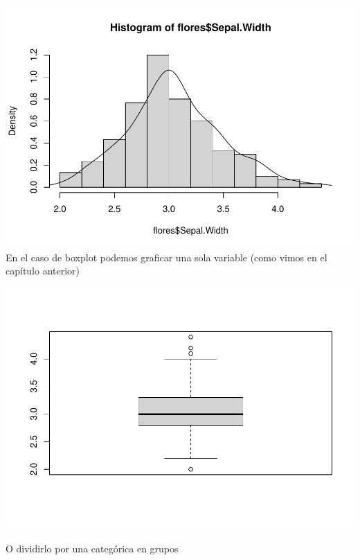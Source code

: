 \documentclass[
]{book}
\newenvironment{Shaded}{\begin{snugshade}}{\end{snugshade}}
\newcommand{\FunctionTok}[1]{\textcolor[rgb]{0.00,0.00,0.00}{#1}}
\newcommand{\NormalTok}[1]{#1}
\newcommand{\SpecialCharTok}[1]{\textcolor[rgb]{0.00,0.00,0.00}{#1}}
\begin{document}
\includegraphics{Esatadistica_en_R_files/figure-latex/unnamed-chunk-139-1.pdf}
En el caso de boxplot podemos graficar una sola variable (como vimos en el capítulo anterior)

\begin{Shaded}
\end{Shaded}

\includegraphics{Esatadistica_en_R_files/figure-latex/unnamed-chunk-140-1.pdf}

O dividirlo por una categórica en grupos

\begin{Shaded}
\end{Shaded}
\end{document}
